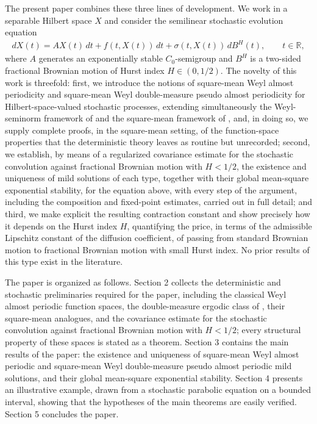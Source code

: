 \documentclass[11pt]{amsart}
\begin{document}
The present paper combines these three lines of development. We work in a separable Hilbert space $X$ and consider the semilinear stochastic evolution equation
\begin{align}\label{maineq}
dX(t)=AX(t)\,dt+f(t,X(t))\,dt+\sigma(t,X(t))\,dB^H(t),\qquad t\in\mathbb R,
\end{align}
where $A$ generates an exponentially stable $C_0$-semigroup and $B^H$ is a two-sided fractional Brownian motion of Hurst index $H\in(0,1/2)$. The novelty of this work is threefold: first, we introduce the notions of square-mean Weyl almost periodicity and square-mean Weyl double-measure pseudo almost periodicity for Hilbert-space-valued stochastic processes, extending simultaneously the Weyl-seminorm framework of \cite{LiWeyl} and the square-mean framework of \cite{BezandryDiagana}, and, in doing so, we supply complete proofs, in the square-mean setting, of the function-space properties that the deterministic theory leaves as routine but unrecorded; second, we establish, by means of a regularized covariance estimate for the stochastic convolution against fractional Brownian motion with $H<1/2$, the existence and uniqueness of mild solutions of each type, together with their global mean-square exponential stability, for the equation above, with every step of the argument, including the composition and fixed-point estimates, carried out in full detail; and third, we make explicit the resulting contraction constant and show precisely how it depends on the Hurst index $H$, quantifying the price, in terms of the admissible Lipschitz constant of the diffusion coefficient, of passing from standard Brownian motion to fractional Brownian motion with small Hurst index. No prior results of this type exist in the literature.

The paper is organized as follows. Section 2 collects the deterministic and stochastic preliminaries required for the paper, including the classical Weyl almost periodic function spaces, the double-measure ergodic class of \cite{BlotCieutatEzzinbi}, their square-mean analogues, and the covariance estimate for the stochastic convolution against fractional Brownian motion with $H<1/2$; every structural property of these spaces is stated as a theorem. Section 3 contains the main results of the paper: the existence and uniqueness of square-mean Weyl almost periodic and square-mean Weyl double-measure pseudo almost periodic mild solutions, and their global mean-square exponential stability. Section 4 presents an illustrative example, drawn from a stochastic parabolic equation on a bounded interval, showing that the hypotheses of the main theorems are easily verified. Section 5 concludes the paper.
\end{document}
